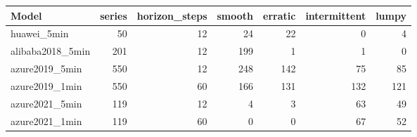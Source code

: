 \begin{tabular}{lrrrrrr}
\toprule
Model & series & horizon_steps & smooth & erratic & intermittent & lumpy \\
\midrule
huawei_5min & 50 & 12 & 24 & 22 & 0 & 4 \\
alibaba2018_5min & 201 & 12 & 199 & 1 & 1 & 0 \\
azure2019_5min & 550 & 12 & 248 & 142 & 75 & 85 \\
azure2019_1min & 550 & 60 & 166 & 131 & 132 & 121 \\
azure2021_5min & 119 & 12 & 4 & 3 & 63 & 49 \\
azure2021_1min & 119 & 60 & 0 & 0 & 67 & 52 \\
\bottomrule
\end{tabular}
